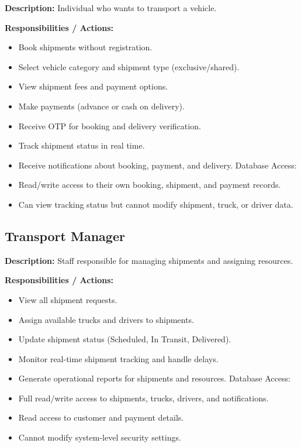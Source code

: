 \documentclass[12pt,a4paper]{article}
\begin{document}
\textbf{Description:} Individual who wants to transport a vehicle.

\textbf{Responsibilities / Actions:}
\begin{itemize}
    \item Book shipments without registration.
\item Select vehicle category and shipment type (exclusive/shared).
\item View shipment fees and payment options.
\item Make payments (advance or cash on delivery).
\item Receive OTP for booking and delivery verification.
\item Track shipment status in real time.
\item Receive notifications about booking, payment, and delivery.
Database Access:
\item Read/write access to their own booking, shipment, and payment records.
\item Can view tracking status but cannot modify shipment, truck, or driver data.

\end{itemize}

\subsection{Transport Manager}

\textbf{Description:} Staff responsible for managing shipments and assigning resources.

\textbf{Responsibilities / Actions:}

\begin{itemize}
\item View all shipment requests.
\item Assign available trucks and drivers to shipments.
\item Update shipment status (Scheduled, In Transit, Delivered).
\item Monitor real-time shipment tracking and handle delays.
\item Generate operational reports for shipments and resources.
Database Access:
\item Full read/write access to shipments, trucks, drivers, and notifications.
\item Read access to customer and payment details.
\item Cannot modify system-level security settings.

\end{itemize}
\end{document}
